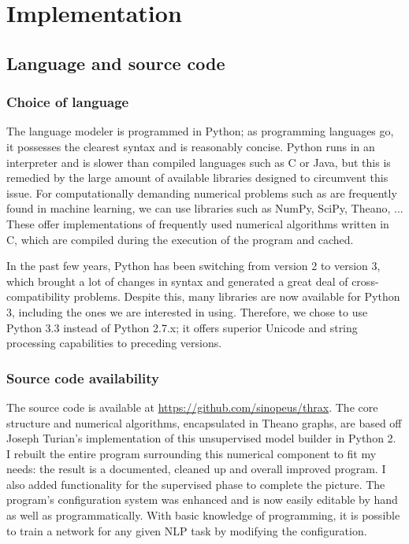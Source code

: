 
\chapter{Implementation}
\label{chp:implementation}

\section{Language and source code}
\label{sec:langsource}
\subsection{Choice of language}
\label{sec:language}
The language modeler is programmed in Python; as programming languages
go, it possesses the clearest syntax and is reasonably concise. Python
runs in an interpreter and is slower than compiled languages such as C
or Java, but this is remedied by the large amount of available
libraries designed to circumvent this issue. For computationally
demanding numerical problems such as are frequently found in machine
learning, we can use libraries such as NumPy, SciPy, Theano, ... These
offer implementations of frequently used numerical algorithms written
in C, which are compiled during the execution of the program and cached. 

In the past few years, Python has been switching from version 2 to
version 3, which brought a lot of changes in syntax and generated a
great deal of cross-compatibility problems. Despite this, many
libraries are now available for Python 3, including the ones we are
interested in using. Therefore, we chose to use Python 3.3 instead of
Python 2.7.x; it offers superior Unicode and string processing
capabilities to preceding versions.

\subsection{Source code availability}
\label{sec:sourcecode}
The source code is available at
\url{https://github.com/sinopeus/thrax}. The core structure and
numerical algorithms, encapsulated in Theano graphs, are based off
Joseph Turian's implementation of this unsupervised model builder in
Python 2. I rebuilt the entire program surrounding this numerical
component to fit my needs: the result is a documented, cleaned up and
overall improved program. I also added functionality for the
supervised phase to complete the picture. The program's configuration
system was enhanced and is now easily editable by hand as well as
programmatically. With basic knowledge of programming, it is possible
to train a network for any given NLP task by modifying the
configuration.

